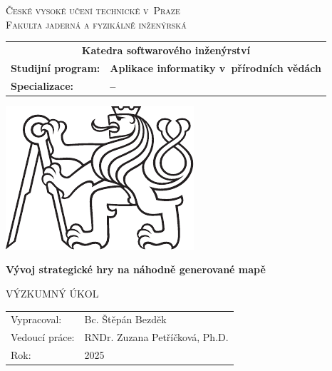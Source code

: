 \documentclass[a4paper,oneside,czech,12pt]{book} %
\newcommand{\tb}{\textbf} %
\newcommand{\cvut}{České vysoké učení technické v~Praze}
\newcommand{\fjfi}{Fakulta jaderná a fyzikálně inženýrská}
\newcommand{\ksi}{Katedra softwarového inženýrství}
\newcommand{\program}{Aplikace informatiky v~přírodních vědách} %
\newcommand{\specializace}{--} %
\newcommand{\druh}{Výzkumný úkol} %
\newcommand{\woman}{} %
\newcommand{\logoCVUT}{\includegraphics{symbol_cvut_konturova_verze_cb.pdf}} %
\newcommand{\nazevcz}{Vývoj strategické hry na náhodně generované mapě}    %
\newcommand{\autor}{Bc. Štěpán Bezděk}   %
\newcommand{\vedouci}{RNDr. Zuzana Petříčková, Ph.D.} %
\newcommand{\rok}{2025}  %
\newcommand{\kde}{Praze}
\newcommand{\prohlaseni}{Prohlašuji, že jsem svůj výzkumný úkol vypracoval\woman{} samostatně a použil\woman{} jsem pouze podklady (literaturu, projekty, SW atd.) uvedené v přiloženém seznamu.} %
\begin{document}
\thispagestyle{empty}

\begin{center}
    {\Large \textsc{\cvut}\\[1.5ex] \textsc{\fjfi}}\\
    \vspace{10mm}

    \begin{tabular}{ll}
		\multicolumn{2}{c}{\tb{\ksi}} \\[8pt]   
		\tb{Studijní program:} & \tb{\program}\\
		\tb{Specializace:} & \tb{\specializace}\\
    \end{tabular}

   \vspace{13mm} \logoCVUT \vspace{15mm} 

   {\huge \tb{\nazevcz}\par}
   \vspace{5mm}   
   
   \vspace{15mm}
   {\Large \MakeUppercase{\druh}}

   \vfill
   {\large
    \begin{tabular}{ll}
    Vypracoval: & \autor\\
    Vedoucí práce: & \vedouci\\
    Rok: & \rok
    \end{tabular}
   }
\end{center}

\thispagestyle{empty} %



\newpage %
\thispagestyle{empty}  %
\end{document}

